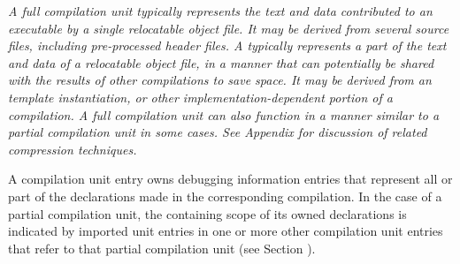 \textit{A full compilation unit typically represents the text and
data contributed to an executable by a single relocatable
object file. It may be derived from several source files,
including pre-processed header files. 
A  typically represents a part 
of the text and data of a relocatable object file, in a manner that 
can potentially be shared with the results of other compilations
to save space. It may be derived from an 
template instantiation, or other implementation-dependent
portion of a compilation. A full compilation unit can also
function in a manner similar to a partial compilation unit
in some cases.
See Appendix 
for discussion of related compression techniques.}

A compilation unit entry owns debugging information
entries that represent all or part of the declarations
made in the corresponding compilation. In the case of a
partial compilation unit, the containing scope of its owned
declarations is indicated by imported unit entries in one
or more other compilation unit entries that refer to that
partial compilation unit (see 
Section ).

